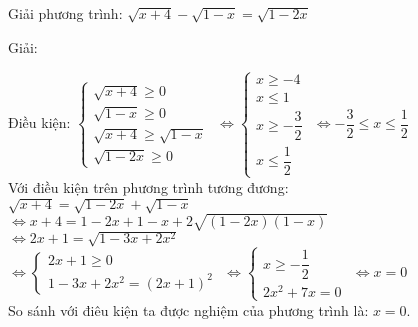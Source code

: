
      
          \begin{vd}
              Giải phương trình: $\sqrt{x+4} - \sqrt{1-x} = \sqrt{1-2x}$
          \end{vd}
          \begin{center}

            Giải:
         \end{center}
          Điều kiện:
          $ \begin{cases}
                \sqrt{x+4} \geq 0 \\
                \sqrt{1-x} \geq 0\\
                \sqrt{x+4} \geq \sqrt{1-x} \\
                \sqrt{1-2x} \geq 0     
             \end{cases} 
          $
         $ \Leftrightarrow 
                \begin{cases}
                    x \geq -4 \\
                    x \leq 1 \\
                    x \geq -\dfrac{3}{2} \\
                    x \leq \dfrac{1}{2}
                \end{cases}
         $
         $\Leftrightarrow
          -\dfrac{3}{2} \leq x \leq \dfrac{1}{2}$ \\
         Với điều kiện trên phương trình tương đương: \\
         $\sqrt{x+4} = \sqrt{1-2x} + \sqrt{1-x}$ \\
         $\Leftrightarrow
         x+4 = 1-2x + 1-x + 2 \sqrt{(1-2x)(1-x)}$ \\
         $\Leftrightarrow
         2x+1= \sqrt{1-3x+2x^2}$ \\
         $\Leftrightarrow
            \begin{cases}
                2x + 1 \geq 0 \\
                1 -3x +2x^2 = (2x+1)^2
            \end{cases}
         $
         $\Leftrightarrow
            \begin{cases}
                x \geq -\dfrac{1}{2} \\
                2x^2 + 7x =0 
            \end{cases}
         $
         $\Leftrightarrow x=0 $ \\
         So sánh với điêu kiện ta được nghiệm của phương trình là: $x=0$.
